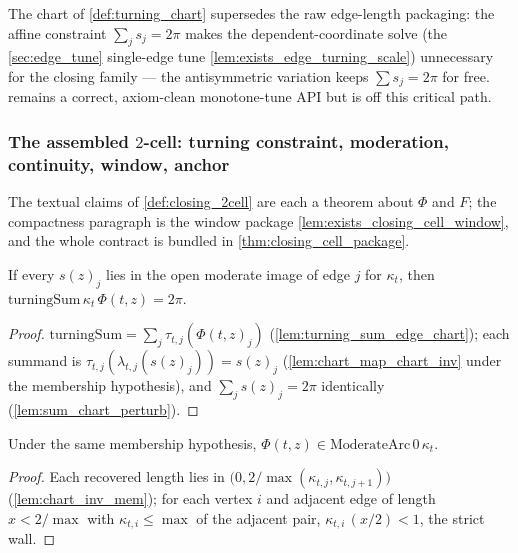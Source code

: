 \begin{remark}
  \label{rem:chart_supersedes_edge_tune}
  The chart of \cref{def:turning_chart} supersedes the raw edge-length packaging:
  the affine constraint $\sum_j s_j = 2\pi$ makes the dependent-coordinate solve
  (the \cref{sec:edge_tune} single-edge tune \cref{lem:exists_edge_turning_scale})
  unnecessary for the closing family --- the antisymmetric variation keeps
  $\sum s_j = 2\pi$ for free.  remains a correct, axiom-clean
  monotone-tune API but is off this critical path.
\end{remark}

\subsubsection*{The assembled $2$-cell: turning constraint, moderation,
continuity, window, anchor}

The textual claims of \cref{def:closing_2cell} are each a theorem about
$\Phi$ and $F$; the compactness paragraph is the window package
\cref{lem:exists_closing_cell_window}, and the whole contract is bundled in
\cref{thm:closing_cell_package}.

\begin{lemma}

  \label{lem:turning_sum_closing_cell}
  If every $s(z)_j$ lies in the open moderate image of edge $j$ for
  $\kappa_t$, then $\mathrm{turningSum}\,\kappa_t\,\Phi(t,z) = 2\pi$.
\end{lemma}
\begin{proof}

\leanok
  $\mathrm{turningSum} = \sum_j \tau_{t,j}(\Phi(t,z)_j)$
  (\cref{lem:turning_sum_edge_chart}); each summand is
  $\tau_{t,j}(\lambda_{t,j}(s(z)_j)) = s(z)_j$
  (\cref{lem:chart_map_chart_inv} under the membership hypothesis), and
  $\sum_j s(z)_j = 2\pi$ identically (\cref{lem:sum_chart_perturb}).
\end{proof}

\begin{lemma}

  \label{lem:moderate_arc_closing_cell}
  Under the same membership hypothesis,
  $\Phi(t,z) \in \mathrm{ModerateArc}\,0\,\kappa_t$.
\end{lemma}
\begin{proof}

\leanok
  Each recovered length lies in $\bigl(0, 2/\max(\kappa_{t,j},
  \kappa_{t,j+1})\bigr)$ (\cref{lem:chart_inv_mem}); for each vertex $i$ and
  adjacent edge of length $x < 2/\max$ with $\kappa_{t,i} \le \max$ of the
  adjacent pair, $\kappa_{t,i}\, (x/2) < 1$, the strict wall.
\end{proof}

